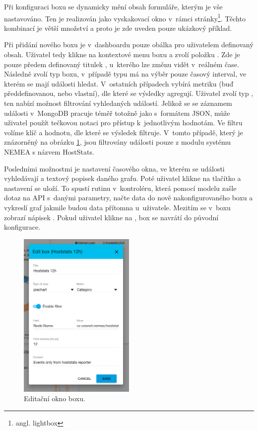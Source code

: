 Při konfiguraci boxu se dynamicky mění obsah formuláře, kterým je vše nastavováno. Ten je realizován jako vyskakovací okno v~rámci stránky\footnote{angl. lightbox}. Těchto kombinací je větší množství a proto je zde uveden pouze ukázkový příklad.

Při přidání nového boxu je v~dashboardu pouze obálka pro uživatelem definovaný obsah. Uživatel tedy klikne na kontextové menu boxu a zvolí položku . Zde je pouze předem definovaný titulek , u~kterého lze změnu vidět v~reálném čase. Následně zvolí typ boxu, v~případě typu  má na výběr pouze časový interval, ve kterém se mají události hledat. V~ostatních případech vybírá metriku (buď předdefinovanou, nebo vlastní), dle které se výsledky agregují. Uživatel zvolí typ , ten nabízí možnost filtrování vyhledaných událostí. Jelikož se se záznamem události v~MongoDB pracuje téměř totožně jako s~formátem JSON, může uživatel použít tečkovou notaci pro přístup k~jednotlivým hodnotám. Ve filtru volíme klíč a hodnotu, dle které se výsledek filtruje. V~tomto případě, který je znázorněný na obrázku \ref{fig:box_edit}, jsou filtrovány události pouze z modulu systému NEMEA s názvem HostStats.

Posledními možnostmi je nastavení časového okna, ve kterém se události vyhledávají a textový popisek daného grafu. Poté uživatel klikne na tlačítko  a nastavení se uloží. To spustí rutinu v~kontroléru, která pomocí modelu zašle dotaz na API s~danými parametry, načte data do nově nakonfigurovaného boxu a vykreslí graf jakmile budou data přítomna u~uživatele. Mezitím se v~boxu zobrazí nápisek . Pokud uživatel klikne na , box se navrátí do původní konfigurace.

\begin{figure}[ht]
    \centering
    \includegraphics[width=0.5\textwidth]{fig/box_edit.png}
    \caption{Editační okno boxu.} \label{fig:box_edit}
\end{figure}

